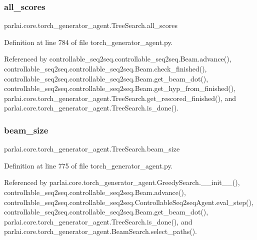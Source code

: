 \subsubsection{\texorpdfstring{all\+\_\+scores}{all\_scores}}
{\footnotesize\ttfamily parlai.\+core.\+torch\+\_\+generator\+\_\+agent.\+Tree\+Search.\+all\+\_\+scores}



Definition at line 784 of file torch\+\_\+generator\+\_\+agent.\+py.



Referenced by controllable\+\_\+seq2seq.\+controllable\+\_\+seq2seq.\+Beam.\+advance(), controllable\+\_\+seq2seq.\+controllable\+\_\+seq2seq.\+Beam.\+check\+\_\+finished(), controllable\+\_\+seq2seq.\+controllable\+\_\+seq2seq.\+Beam.\+get\+\_\+beam\+\_\+dot(), controllable\+\_\+seq2seq.\+controllable\+\_\+seq2seq.\+Beam.\+get\+\_\+hyp\+\_\+from\+\_\+finished(), parlai.\+core.\+torch\+\_\+generator\+\_\+agent.\+Tree\+Search.\+get\+\_\+rescored\+\_\+finished(), and parlai.\+core.\+torch\+\_\+generator\+\_\+agent.\+Tree\+Search.\+is\+\_\+done().

\mbox{\label{classparlai_1_1core_1_1torch__generator__agent_1_1TreeSearch_a2381c33e5233a5f5c1e50c65ab0ee572}} 
\subsubsection{\texorpdfstring{beam\+\_\+size}{beam\_size}}
{\footnotesize\ttfamily parlai.\+core.\+torch\+\_\+generator\+\_\+agent.\+Tree\+Search.\+beam\+\_\+size}



Definition at line 775 of file torch\+\_\+generator\+\_\+agent.\+py.



Referenced by parlai.\+core.\+torch\+\_\+generator\+\_\+agent.\+Greedy\+Search.\+\_\+\+\_\+init\+\_\+\+\_\+(), controllable\+\_\+seq2seq.\+controllable\+\_\+seq2seq.\+Beam.\+advance(), controllable\+\_\+seq2seq.\+controllable\+\_\+seq2seq.\+Controllable\+Seq2seq\+Agent.\+eval\+\_\+step(), controllable\+\_\+seq2seq.\+controllable\+\_\+seq2seq.\+Beam.\+get\+\_\+beam\+\_\+dot(), parlai.\+core.\+torch\+\_\+generator\+\_\+agent.\+Tree\+Search.\+is\+\_\+done(), and parlai.\+core.\+torch\+\_\+generator\+\_\+agent.\+Beam\+Search.\+select\+\_\+paths().

